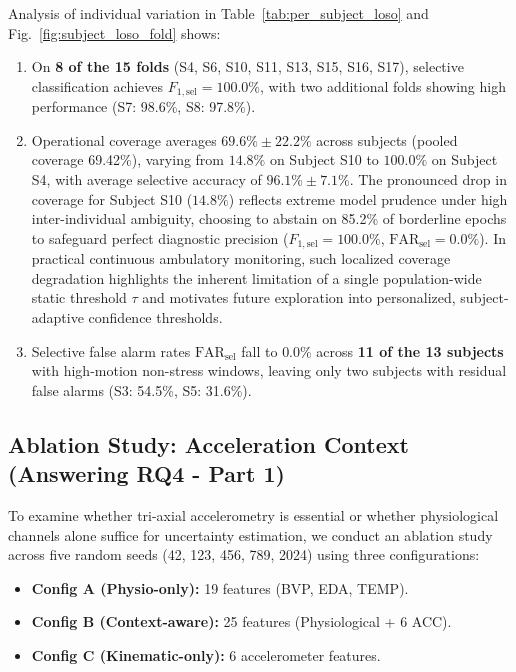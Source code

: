 \documentclass[conference]{IEEEtran}
\begin{document}
Analysis of individual variation in Table~\ref{tab:per_subject_loso} and Fig.~\ref{fig:subject_loso_fold} shows:
\begin{enumerate}
    \item On \textbf{8 of the 15 folds} (S4, S6, S10, S11, S13, S15, S16, S17), selective classification achieves $F_{1,\text{sel}} = 100.0\%$, with two additional folds showing high performance (S7: 98.6\%, S8: 97.8\%).
    \item Operational coverage averages $69.6\% \pm 22.2\%$ across subjects (pooled coverage 69.42\%), varying from $14.8\%$ on Subject S10 to $100.0\%$ on Subject S4, with average selective accuracy of $96.1\% \pm 7.1\%$. The pronounced drop in coverage for Subject S10 ($14.8\%$) reflects extreme model prudence under high inter-individual ambiguity, choosing to abstain on 85.2\% of borderline epochs to safeguard perfect diagnostic precision ($F_{1,\text{sel}} = 100.0\%$, $\text{FAR}_{\text{sel}} = 0.0\%$). In practical continuous ambulatory monitoring, such localized coverage degradation highlights the inherent limitation of a single population-wide static threshold $\tau$ and motivates future exploration into personalized, subject-adaptive confidence thresholds.
    \item Selective false alarm rates $\text{FAR}_{\text{sel}}$ fall to $0.0\%$ across \textbf{11 of the 13 subjects} with high-motion non-stress windows, leaving only two subjects with residual false alarms (S3: 54.5\%, S5: 31.6\%).
\end{enumerate}

\subsection{Ablation Study: Acceleration Context (Answering RQ4 - Part 1)}
To examine whether tri-axial accelerometry is essential or whether physiological channels alone suffice for uncertainty estimation, we conduct an ablation study across five random seeds (42, 123, 456, 789, 2024) using three configurations:
\begin{itemize}
    \item \textbf{Config A (Physio-only):} 19 features (BVP, EDA, TEMP).
    \item \textbf{Config B (Context-aware):} 25 features (Physiological + 6 ACC).
    \item \textbf{Config C (Kinematic-only):} 6 accelerometer features.
\end{itemize}
\end{document}
